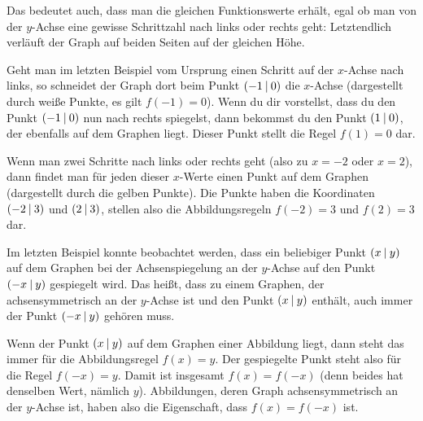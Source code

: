 \documentclass[../../main.tex]{subfiles}
\begin{document}
Das bedeutet auch, dass man die gleichen Funktionswerte erhält, egal ob man von der $y$-Achse eine gewisse Schrittzahl nach links oder rechts geht: Letztendlich verläuft der Graph auf beiden Seiten auf der gleichen Höhe.

\begin{example}{}
    Geht man im letzten Beispiel vom Ursprung einen Schritt auf der $x$-Achse nach links, so schneidet der Graph dort beim Punkt $\left(-1 \:\middle|\: 0\right)$ die $x$-Achse (dargestellt durch weiße Punkte, es gilt $f(-1)=0$). Wenn du dir vorstellst, dass du den Punkt $\left(-1 \:\middle|\: 0\right)$ nun nach rechts spiegelst, dann bekommst du den Punkt $\left(1 \:\middle|\: 0\right)$, der ebenfalls auf dem Graphen liegt. Dieser Punkt stellt die Regel $f(1)=0$ dar.
    
    Wenn man zwei Schritte nach links oder rechts geht (also zu $x=-2$ oder $x=2$), dann findet man für jeden dieser $x$-Werte einen Punkt auf dem Graphen (dargestellt durch die gelben Punkte). Die Punkte haben die Koordinaten $\left(-2 \:\middle|\: 3\right)$ und $\left(2 \:\middle|\: 3\right)$, stellen also die Abbildungsregeln $f(-2)=3$ und $f(2)=3$ dar.
\end{example}

Im letzten Beispiel konnte beobachtet werden, dass ein beliebiger Punkt $\left(x \:\middle|\: y\right)$ auf dem Graphen bei der Achsenspiegelung an der $y$-Achse auf den Punkt $\left(-x \:\middle|\: y\right)$ gespiegelt wird. Das heißt, dass zu einem Graphen, der achsensymmetrisch an der $y$-Achse ist und den Punkt $\left(x \:\middle|\: y\right)$ enthält, auch immer der Punkt $\left(-x \:\middle|\: y\right)$ gehören muss.

Wenn der Punkt $\left(x \:\middle|\: y\right)$ auf dem Graphen einer Abbildung liegt, dann steht das immer für die Abbildungsregel $f(x)=y$. Der gespiegelte Punkt steht also für die Regel $f(-x)=y$. Damit ist insgesamt $f(x)=f(-x)$ (denn beides hat denselben Wert, nämlich $y$). Abbildungen, deren Graph achsensymmetrisch an der $y$-Achse ist, haben also die Eigenschaft, dass $f(x)=f(-x)$ ist.
\end{document}
